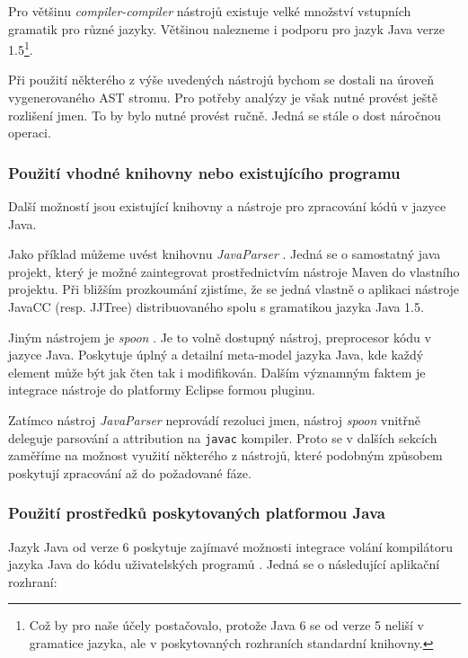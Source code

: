 \vspace{0.5cm}

Pro většinu \emph{compiler-compiler} nástrojů existuje velké množství vstupních gramatik pro různé jazyky. Většinou nalezneme i podporu pro jazyk Java verze 1.5\footnote{Což by pro naše účely postačovalo, protože Java 6 se od verze 5 neliší v gramatice jazyka, ale v poskytovaných rozhraních standardní knihovny.}.

Při použití některého z výše uvedených nástrojů bychom se dostali na úroveň vygenerovaného AST stromu. Pro potřeby analýzy je však nutné provést ještě rozlišení jmen. To by bylo nutné provést ručně. Jedná se stále o dost náročnou operaci.

\subsubsection{Použití vhodné knihovny nebo existujícího programu}
Další možností jsou existující knihovny a nástroje pro zpracování kódů v jazyce Java.

Jako příklad můžeme uvést knihovnu \emph{JavaParser} \cite{parsertools:javaparser}. Jedná se o samostatný java projekt, který je možné zaintegrovat prostřednictvím nástroje Maven do vlastního projektu. Při bližším prozkoumání zjistíme, že se jedná vlastně o aplikaci nástroje JavaCC (resp. JJTree) distribuovaného spolu s gramatikou jazyka Java 1.5.

Jiným nástrojem je \emph{spoon} \cite{parsertools:spoon}. Je to volně dostupný nástroj, preprocesor kódu v jazyce Java. Poskytuje úplný a detailní meta-model jazyka Java, kde každý element může být jak čten tak i modifikován. Dalším významným faktem je integrace nástroje do platformy Eclipse formou pluginu.

Zatímco nástroj \emph{JavaParser} neprovádí rezoluci jmen, nástroj \emph{spoon} vnitřně deleguje parsování a attribution na \verb+javac+ kompiler. Proto se v dalších sekcích zaměříme na možnost využití některého z nástrojů, které podobným způsobem poskytují zpracování až do požadované fáze.

\subsubsection{Použití prostředků poskytovaných platformou Java}
Jazyk Java od verze 6 poskytuje zajímavé možnosti integrace volání kompilátoru jazyka Java do kódu uživatelských programů \cite{source_code_analysis_corejavatechtips}. Jedná se o následující aplikační rozhraní:


